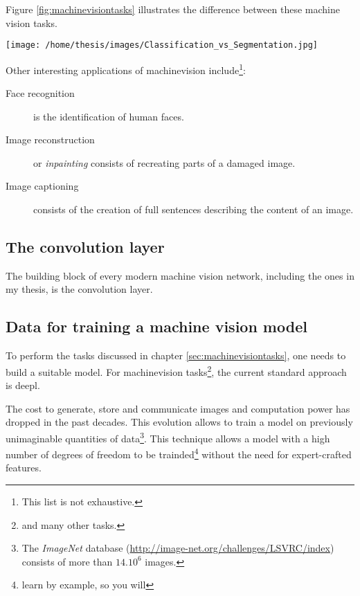 Figure \ref{fig:machinevisiontasks} illustrates the difference between these machine vision tasks. 

\begin{SCfigure}[][h!]
    \centering
    \texttt{[image: /home/thesis/images/Classification\_vs\_Segmentation.jpg]}
    \caption{Illustration to compare different Machine vision tasks \cite{SemTorch76:online}. 
    Object detection means that the location of several objects is estimated by the model. This is indicated by the \textit{bounding boxes}.
    Segmentation of an image is classifying each pixel in the correct class or assigning it to the \textit{background} class.
    Semantic segmentation makes no difference between different instances of the same semantic class, instance segmentation does.
    \label{fig:machinevisiontasks}}
\end{SCfigure}

Other interesting applications of \gls{machinevision} include\footnote{This list is not exhaustive.}:
\begin{description}
    \item[Face recognition] is the identification of human faces. 
    \item[Image reconstruction] or \textit{inpainting} consists of recreating parts of a damaged image.
    \item[Image captioning] consists of the creation of full sentences describing the content of an image.    
\end{description}

\subsection{The convolution layer}

The building block of every modern machine vision network, including the ones in my thesis, is the convolution layer.


\subsection{Data for training a machine vision model}

To perform the tasks discussed in chapter \ref{sec:machinevisiontasks}, one needs to build a suitable model.
For \Gls{machinevision} tasks\footnote{and many other tasks.}, the current standard approach is \Gls{deepl}.


The cost to generate, store and communicate images and computation power has dropped in the past decades.
This evolution allows to train a model  on previously unimaginable quantities of data\footnote{The \textit{ImageNet} database (\url{http://image-net.org/challenges/LSVRC/index}) consists of more than $14.10^6$ images.}.
This technique allows a model with a high number of degrees of freedom to be trainded\footnote{learn by example, so you will} without the need for expert-crafted features. 


